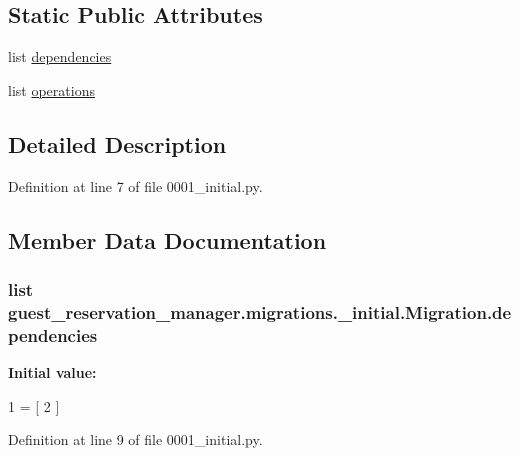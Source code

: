 \subsection*{Static Public Attributes}
\begin{DoxyCompactItemize}
\item 
list \hyperlink{classguest__reservation__manager_1_1migrations_1_10001__initial_1_1Migration_a76459ef452ff537b0aedbbbd2e016e39}{dependencies}
\item 
list \hyperlink{classguest__reservation__manager_1_1migrations_1_10001__initial_1_1Migration_a7c69d38a5ee350030b27d2d53c6da642}{operations}
\end{DoxyCompactItemize}


\subsection{Detailed Description}


Definition at line 7 of file 0001\-\_\-initial.\-py.



\subsection{Member Data Documentation}
\hypertarget{classguest__reservation__manager_1_1migrations_1_10001__initial_1_1Migration_a76459ef452ff537b0aedbbbd2e016e39}{
\subsubsection[{dependencies}]{\setlength{\rightskip}{0pt plus 5cm}list guest\-\_\-reservation\-\_\-manager.\-migrations.\-\_\-initial.\-Migration.\-dependencies\hspace{0.3cm}{\ttfamily [static]}}}\label{classguest__reservation__manager_1_1migrations_1_10001__initial_1_1Migration_a76459ef452ff537b0aedbbbd2e016e39}
{\bfseries Initial value\-:}
\begin{DoxyCode}
1 = [
2     ]
\end{DoxyCode}


Definition at line 9 of file 0001\-\_\-initial.\-py.

